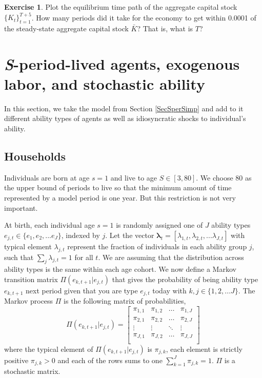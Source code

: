 \documentclass[letterpaper,12pt]{article}
\theoremstyle{definition}
\newtheorem{exercise}{Exercise} %
\numberwithin{equation}{section}
\numberwithin{exercise}{section}
\begin{document}
\begin{spacing}{1.5}
      \begin{exercise} \label{ExSperSimp_TPIplot}
         Plot the equilibrium time path of the aggregate capital stock $\{K_t\}_{t=1}^{T+5}$. How many periods did it take for the economy to get within 0.0001 of the steady-state aggregate capital stock $\bar{K}$? That is, what is $T$?
      \end{exercise}


\newpage
\section{\textit{S}-period-lived agents, exogenous labor, and stochastic ability}\label{SecSperStoch}

   In this section, we take the model from Section \ref{SecSperSimp} and add to it different ability types of agents as well as idiosyncratic shocks to individual's ability.


   \subsection{Households}\label{SecSperStochHH}

      Individuals are born at age $s=1$ and live to age $S\in[3,80]$. We choose 80 as the upper bound of periods to live so that the minimum amount of time represented by a model period is one year. But this restriction is not very important.

      At birth, each individual age $s=1$ is randomly assigned one of $J$ ability types $e_{j,t}\in\{e_1,e_2,...e_J\}$, indexed by $j$. Let the vector $\bm{\lambda}_t = [\lambda_{1,t},\lambda_{2,t},...\lambda_{J,t}]$ with typical element $\lambda_{j,t}$ represent the fraction of individuals in each ability group $j$, such that $\sum_j\lambda_{j,t}=1$ for all $t$. We are assuming that the distribution across ability types is the same within each age cohort. We now define a Markov transition matrix $\Pi(e_{k,t+1}|e_{j,t})$ that gives the probability of being ability type $e_{k,t+1}$ next period given that you are type $e_{j,t}$ today with $k,j\in\{1,2,...J\}$. The Markov process $\Pi$ is the following matrix of probabilities,
      \begin{equation}\label{EqMarkovTrans}
         \Pi(e_{k,t+1}|e_{j,t}) =
            \begin{bmatrix}
               \pi_{1,1} & \pi_{1,2} & \hdots & \pi_{1,J} \\
               \pi_{2,1} & \pi_{2,2} & \hdots & \pi_{2,J} \\
               \vdots    & \vdots    & \ddots & \vdots    \\
               \pi_{J,1} & \pi_{J,2} & \hdots & \pi_{J,J} \\
            \end{bmatrix}
      \end{equation}
      where the typical element of $\Pi(e_{k,t+1}|e_{j,t})$ is $\pi_{j,k}$, each element is strictly positive $\pi_{j,k}>0$ and each of the rows sums to one $\sum_{k=1}^J \pi_{j,k} = 1$. $\Pi$ is a stochastic matrix.


\end{spacing}
\end{document}
